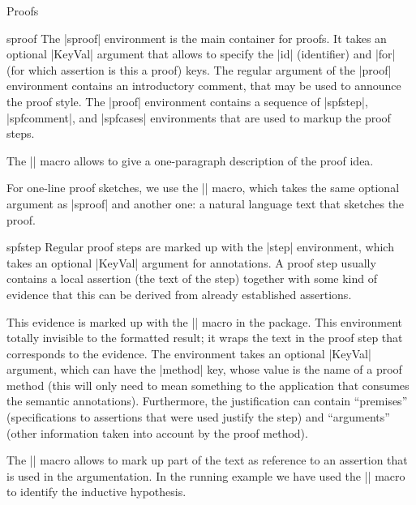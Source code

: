 \begin{sfragment}{Proofs}
\begin{environment}{sproof}
  The |sproof| environment is the main container for proofs. It takes an optional |KeyVal|
  argument that allows to specify the |id| (identifier) and |for| (for which assertion is
  this a proof) keys. The regular argument of the |proof| environment contains an
  introductory comment, that may be used to announce the proof style. The |proof|
  environment contains a sequence of |spfstep|, |spfcomment|, and |spfcases| environments
  that are used to markup the proof steps.
\end{environment}
  
\begin{function}{\spfidea}
  The |\spfidea| macro allows to give a one-paragraph description of the proof idea.
\end{function}

\begin{function}{\spfsketch}
  For one-line proof sketches, we use the |\spfsketch| macro, which takes the same
  optional argument as |sproof| and another one: a natural language text that sketches
  the proof.
\end{function}

\begin{environment}{spfstep}
  Regular proof steps are marked up with the |step| environment, which takes an optional
  |KeyVal| argument for annotations. A proof step usually contains a local assertion
  (the text of the step) together with some kind of evidence that this can be derived
  from already established assertions.
\end{environment}

\begin{function}{\spfjust}
  This evidence is marked up with the |\spfjust| macro in the 
  package. This environment totally invisible to the formatted result; it wraps the text
  in the proof step that corresponds to the evidence. The environment takes an optional
  |KeyVal| argument, which can have the |method| key, whose value is the name of a proof
  method (this will only need to mean something to the application that consumes the
  semantic annotations). Furthermore, the justification can contain ``premises''
  (specifications to assertions that were used justify the step) and ``arguments''
  (other information taken into account by the proof method).
\end{function}

\begin{function}{\premise}
  The |\premise| macro allows to mark up part of the text as reference to an assertion
  that is used in the argumentation. In the running example we have used the |\premise|
  macro to identify the inductive hypothesis.
\end{function}


\end{sfragment}
